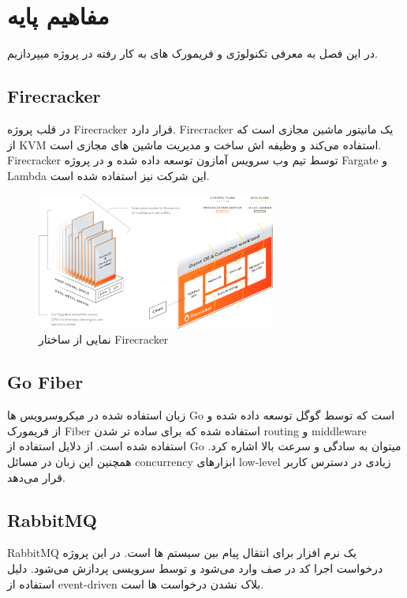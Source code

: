 \chapter{مفاهیم پایه}

در این فصل به معرفی تکنولوژی و فریمورک های به کار رفته در پروژه میپردازیم.

\section{Firecracker}
در قلب پروژه Firecracker قرار دارد. Firecracker یک مانیتور ماشین مجازی است که از KVM استفاده می‌کند و
وظیفه اش ساخت و مدیریت ماشین های مجازی است.
Firecracker توسط تیم وب سرویس آمازون توسعه داده شده و در پروژه Fargate و Lambda این شرکت نیز استفاده شده است.

\begin{figure}[h]
    \centering
    \includegraphics[width=0.7\textwidth]{./2-Basic-Concepts/firecracker-diagram.png}
    \caption{نمایی از ساختار Firecracker}
    \label{fig:firecracker}
\end{figure}

\section{Go Fiber}
زبان استفاده شده در میکروسرویس ها Go است که توسط گوگل توسعه داده شده و از فریمورک Fiber استفاده شده که برای ساده تر شدن routing و middleware استفاده شده است.
از دلایل استفاده از Go میتوان به سادگی و سرعت بالا اشاره کرد. همچنین این زبان در مسائل concurrency ابزارهای low-level زیادی در دسترس کاربر قرار می‌دهد.

\section{RabbitMQ}
RabbitMQ یک نرم افزار برای انتقال پیام بین سیستم ها است.
در این پروژه درخواست اجرا کد در صف وارد می‌شود و توسط سرویسی پردازش می‌شود.
دلیل استفاده از event-driven بلاک نشدن درخواست ها است.

